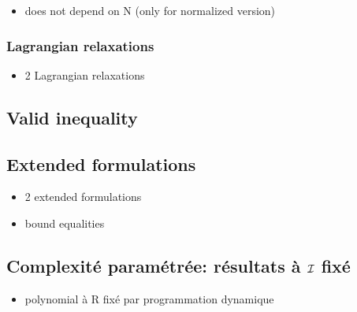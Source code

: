 \begin{itemize}
  \item does not depend on N (only for normalized version)
\end{itemize}

\subsubsection{Lagrangian relaxations}

\begin{itemize}
  \item 2 Lagrangian relaxations
\end{itemize}


\subsection{Valid inequality}


\subsection{Extended formulations}

\begin{itemize}
  \item 2 extended formulations
  \item bound equalities
\end{itemize}


\subsection{Complexité paramétrée: résultats à $\mathcal{I}$ fixé}


\begin{itemize}
  \item polynomial à R fixé par programmation dynamique
\end{itemize}
